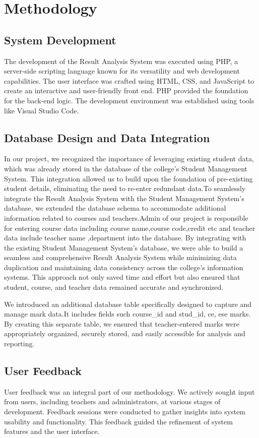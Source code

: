 \documentclass{nascproject}
\begin{document}
\chapter{Methodology}
\section{System Development}
The development of the Result Analysis System was executed using PHP, a server-side scripting language known for its versatility and web development capabilities. The user interface was crafted using HTML, CSS, and JavaScript to create an interactive and user-friendly front end. PHP provided the foundation for the back-end logic. The development environment was established using tools like Visual Studio Code.

\section{Database Design and Data Integration}
In our project, we recognized the importance of leveraging existing student data, which was already stored in the database of the college's Student Management System. This integration allowed us to build upon the foundation of pre-existing student details, eliminating the need to re-enter redundant data.To seamlessly integrate the Result Analysis System with the Student Management System's database, we extended the database schema to accommodate additional information related to courses and teachers.Admin of our project is responsible for entering course data including course name,course code,credit etc and teacher data include teacher name ,department into the database. By integrating with the existing Student Management System's database, we were able to build a seamless and comprehensive Result Analysis System while minimizing data duplication and maintaining data consistency across the college's information systems. This approach not only saved time and effort but also ensured that student, course, and teacher data remained accurate and synchronized.

We introduced an additional database table specifically designed to capture and manage mark data.It includes fields such course{\_}id and stud{\_}id, ce, ese marks. By creating this separate table, we ensured that teacher-entered marks were appropriately organized, securely stored, and easily accessible for analysis and reporting.
\section{User Feedback}
User feedback was an integral part of our methodology. We actively sought input from users, including teachers and administrators, at various stages of development. Feedback sessions were conducted to gather insights into system usability and functionality. This feedback guided the refinement of system features and the user interface.
\end{document}
